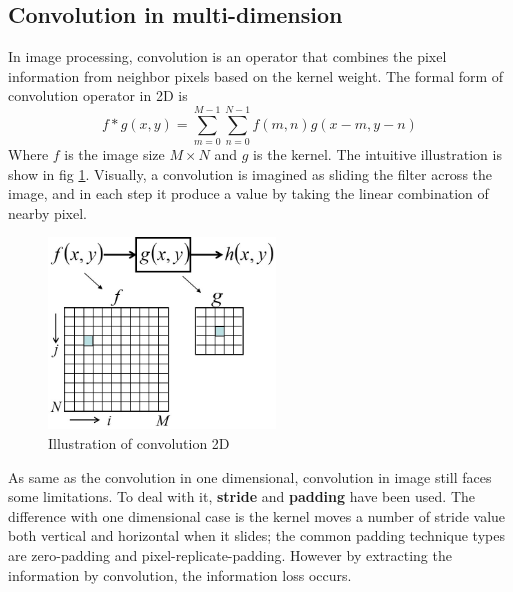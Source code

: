 \subsection{Convolution in multi-dimension}
In image processing, convolution is an operator that combines the pixel information from neighbor pixels based on the kernel weight. The formal form of convolution operator in 2D is 
\begin{equation}
    f \ast g(x,y) = \sum_{m=0}^{M-1}{\sum_{n=0}^{N-1}{f(m,n)g(x-m,y-n)}}
\end{equation}
Where $f$ is the image size $M \times N$ and $g$ is the kernel. The intuitive illustration is show in fig \ref{fig:conv2d_op}. Visually, a convolution is imagined as sliding the filter across the image, and in each step it produce a value by taking the linear combination of nearby pixel.
\begin{figure}[h!]
    \centering
    \includegraphics[height=2in]{content/resources/new_images/background/conv2d.jpeg}
    \caption{Illustration of convolution 2D}
    \label{fig:conv2d_op}
\end{figure}
As same as the convolution in one dimensional, convolution in image still faces some limitations. To deal with it, \textbf{stride} and \textbf{padding} have been used. The difference with one dimensional case is the kernel moves a number of stride value both vertical and horizontal when it slides; the common padding technique types are zero-padding and pixel-replicate-padding. However by extracting the information by convolution, the information loss occurs.
